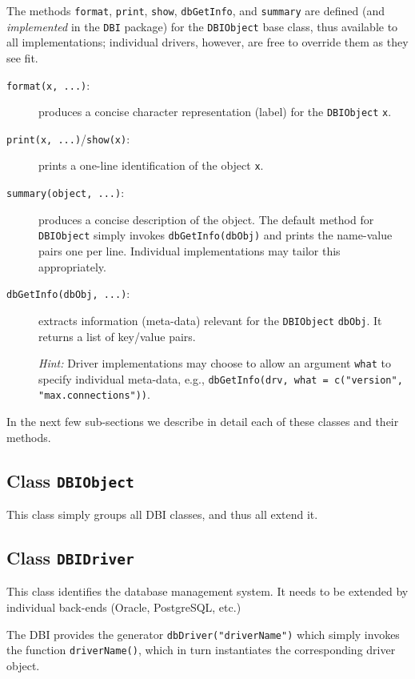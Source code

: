 \documentclass[graphics,times,psfig,dvips,hyper]{article}
\newcommand{\sfun}[1]{\mbox{\tt #1()}}  %
\newcommand{\sobj}[1]{\mbox{\tt #1}}    %
\newcommand{\sexp}[1]{\mbox{\tt #1}}    %
\newcommand{\sclass}[1]{\mbox{\tt #1}}  %
\newcommand{\smethod}[1]{\mbox{\tt #1}} %
\begin{document}
The methods \smethod{format}, \smethod{print}, \smethod{show}, 
\smethod{dbGetInfo}, and \smethod{summary}
are defined (and \emph{implemented} in the \sobj{DBI} package) 
for the \sclass{DBIObject} base class, thus available to all 
implementations; individual drivers, however, are free to override 
them as they see fit.
\begin{description} 
\item[\smethod{format(x, ...)}:]
   produces a concise character representation (label) for the
   \sclass{DBIObject} \sobj{x}.

\item[\smethod{print(x, ...)}/\smethod{show(x)}:]
  prints a one-line identification of the object \sobj{x}.

\item[\smethod{summary(object, ...)}:]
  produces a concise description of the object.
  The default method for \sclass{DBIObject} simply 
  invokes \sexp{dbGetInfo(dbObj)} and prints the name-value
  pairs one per line.  Individual implementations may tailor
  this appropriately.

\item[\smethod{dbGetInfo(dbObj, ...)}:]
  extracts information (meta-data) relevant for the
  \sclass{DBIObject} \sobj{dbObj}.  It returns a list
  of key/value pairs.

  \emph{Hint:} Driver implementations may choose to allow an 
  argument \sobj{what} to specify individual meta-data,  e.g., 
  \sexp{dbGetInfo(drv, what = c("version", "max.connections"))}.

\end{description}

In the next few sub-sections we describe in detail each of these
classes and their methods.

\subsection{Class \sclass{DBIObject}}\label{sec:DBIObject}
This class simply groups all DBI classes, and thus all extend it.

\subsection{Class \sclass{DBIDriver}}\label{sec:DBIDriver}
This class identifies the database management system. It needs to 
be extended by individual back-ends (Oracle, PostgreSQL, etc.)

The DBI provides the generator \sexp{dbDriver("driverName")} 
which simply invokes the function \sfun{driverName}, which
in turn instantiates the corresponding driver object.
\end{document}
